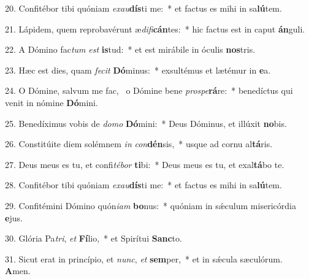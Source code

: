 20. Confitébor tibi quóniam \textit{ex}\textit{au}\textbf{dís}ti me:~*  et factus es mihi in sa\textbf{lú}tem.\

21. Lápidem, quem reprobavérunt æ\textit{di}\textit{fi}\textbf{cán}tes:~*  hic factus est in caput \textbf{án}guli.\

22. A Dómino fac\textit{tum} \textit{est} \textbf{is}tud:~*  et est mirábile in óculis \textbf{nos}tris.\

23. Hæc est dies, quam \textit{fe}\textit{cit} \textbf{Dó}minus:~*  exsultémus et lætémur in \textbf{e}a.\

24. O Dómine, salvum me fac, \dag\  o Dómine bene \textit{pro}\textit{spe}\textbf{rá}re:~*  benedíctus qui venit in nómine \textbf{Dó}mini.\

25. Benedíximus vobis de \textit{do}\textit{mo} \textbf{Dó}mini:~*  Deus Dóminus, et illúxit \textbf{no}bis.\

26. Constitúite diem solémnem \textit{in} \textit{con}\textbf{dén}sis,~*  usque ad cornu al\textbf{tá}ris.\

27. Deus meus es tu, et confi\textit{té}\textit{bor} \textbf{ti}bi:~*  Deus meus es tu, et exal\textbf{tá}bo te.\

28. Confitébor tibi quóniam \textit{ex}\textit{au}\textbf{dís}ti me:~*  et factus es mihi in sa\textbf{lú}tem.\

29. Confitémini Dómino quón\textit{i}\textit{am} \textbf{bo}nus:~*  quóniam in sǽculum misericórdia \textbf{e}jus.\

30. Glória Pa\textit{tri}, \textit{et} \textbf{Fí}lio,~*  et Spirítui \textbf{Sanc}to.\

31. Sicut erat in princípio, et \textit{nunc}, \textit{et} \textbf{sem}per,~*  et in sǽcula sæculórum. \textbf{A}men.\

